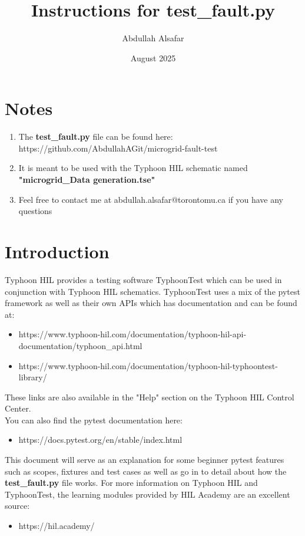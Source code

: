 \documentclass{article}
\title{Instructions for test\_fault.py}
\author{Abdullah Alsafar}
\date{August 2025}
\begin{document}
\maketitle
\tableofcontents
\newpage

\section{Notes}
\begin{enumerate}
    \item The \textbf{test\_fault.py} file can be found here: \\ https://github.com/AbdullahAGit/microgrid-fault-test
    \item It is meant to be used with the Typhoon HIL schematic named \\ \textbf{"microgrid\_Data generation.tse"}
    \item Feel free to contact me at abdullah.alsafar@torontomu.ca if you have any questions
\end{enumerate}
\section{Introduction}
Typhoon HIL provides a testing software TyphoonTest which can be used in conjunction with  Typhoon HIL schematics. TyphoonTest uses a mix of the pytest framework as well as their own APIs which has documentation and can be found at:
\begin{itemize}
    \item https://www.typhoon-hil.com/documentation/typhoon-hil-api-documentation/typhoon\_api.html
    \item https://www.typhoon-hil.com/documentation/typhoon-hil-typhoontest-library/
\end{itemize}

\noindent These links are also available in the "Help" section on the Typhoon HIL Control Center.\\

\noindent You can also find the pytest documentation here:
\begin{itemize}
    \item https://docs.pytest.org/en/stable/index.html
\end{itemize}

This document will serve as an explanation for some beginner pytest features such as scopes, fixtures and test cases as well as go in to detail about how the \textbf{test\_fault.py} file works. For more information on Typhoon HIL and TyphoonTest, the learning modules provided by HIL Academy are an excellent source:
\begin{itemize}
    \item https://hil.academy/
\end{itemize}
\end{document}
